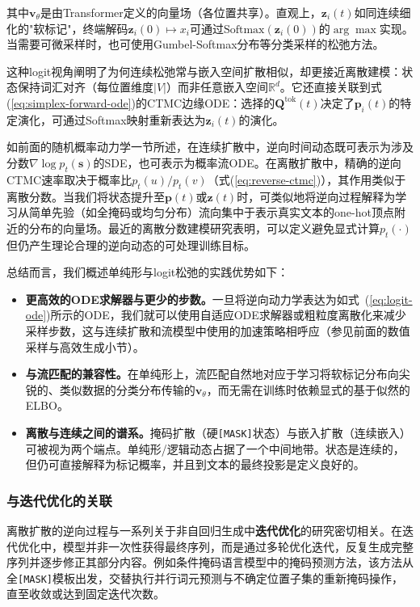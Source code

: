 \noindent 其中$\mathbf{v}_{\theta}$是由Transformer定义的向量场（各位置共享）。直观上，$\mathbf{z}_i(t)$如同连续细化的"软标记"，终端解码$\mathbf{z}_i(0)\mapsto x_i$可通过$\mathrm{Softmax}(\mathbf{z}_i(0))$的$\arg\max$实现。当需要可微采样时，也可使用Gumbel-Softmax分布等分类采样的松弛方法\citep{jang-etal:2017categorical,maddison-etal:2017the}。

这种logit视角阐明了为何连续松弛常与嵌入空间扩散相似，却更接近离散建模：状态保持词汇对齐（每位置维度$|V|$）而非任意嵌入空间$\mathbb{R}^d$。它还直接关联到式(\ref{eq:simplex-forward-ode})的CTMC边缘ODE：选择的$\mathbf{Q}^{\mathrm{tok}}(t)$决定了$\mathbf{p}_i(t)$的特定演化，可通过Softmax映射重新表达为$\mathbf{z}_i(t)$的演化。

如前面的随机概率动力学一节所述，在连续扩散中，逆向时间动态既可表示为涉及分数$\nabla \log p_t(\mathbf{s})$的SDE，也可表示为概率流ODE。在离散扩散中，精确的逆向CTMC速率取决于概率比$p_t(u)/p_t(v)$（式(\ref{eq:reverse-ctmc})），其作用类似于离散分数。当我们将状态提升至$\mathbf{p}(t)$或$\mathbf{z}(t)$时，可类似地将逆向过程解释为学习从简单先验（如全掩码或均匀分布）流向集中于表示真实文本的one-hot顶点附近的分布的向量场。最近的离散分数建模研究表明，可以定义避免显式计算$p_t(\cdot)$但仍产生理论合理的逆向动态的可处理训练目标\citep{hoogeboom-etal:2021argmax,lou-etal:2024discrete}。

总结而言，我们概述单纯形与logit松弛的实践优势如下：
\begin{itemize}
\item \textbf{更高效的ODE求解器与更少的步数。}一旦将逆向动力学表达为如式~(\ref{eq:logit-ode})所示的ODE，我们就可以使用自适应ODE求解器或粗粒度离散化来减少采样步数，这与连续扩散和流模型中使用的加速策略相呼应（参见前面的数值采样与高效生成小节）。
\item \textbf{与流匹配的兼容性。}在单纯形上，流匹配自然地对应于学习将软标记分布向尖锐的、类似数据的分类分布传输的$\mathbf{v}_\theta$，而无需在训练时依赖显式的基于似然的ELBO。
\item \textbf{离散与连续之间的谱系。}掩码扩散（硬\texttt{[MASK]}状态）与嵌入扩散（连续嵌入）可被视为两个端点。单纯形/逻辑动态占据了一个中间地带。状态是连续的，但仍可直接解释为标记概率，并且到文本的最终投影是定义良好的。
\end{itemize}
\subsubsection{与迭代优化的关联}

离散扩散的逆向过程与一系列关于非自回归生成中\textbf{迭代优化}的研究密切相关\citep{lee-etal:2018deterministic}。在迭代优化中，模型并非一次性获得最终序列，而是通过多轮优化迭代，反复生成完整序列并逐步修正其部分内容。例如条件掩码语言模型中的掩码预测方法，该方法从全\texttt{[MASK]}模板出发，交替执行并行词元预测与不确定位置子集的重新掩码操作，直至收敛或达到固定迭代次数\citep{ghazvininejad-etal:2019mask}。

